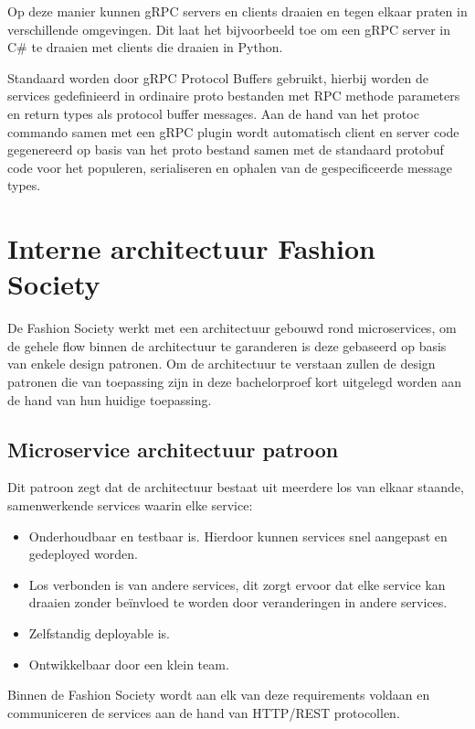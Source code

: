 Op deze manier kunnen gRPC servers en clients draaien en tegen elkaar praten in verschillende omgevingen. Dit laat het bijvoorbeeld toe om een gRPC server in C\# te draaien met clients die draaien in Python.

Standaard worden door gRPC Protocol Buffers gebruikt, hierbij worden de services gedefinieerd in ordinaire proto bestanden met RPC methode parameters en return types als protocol buffer messages. Aan de hand van het protoc commando samen met een gRPC plugin wordt automatisch client en server code gegenereerd op basis van het proto bestand samen met de standaard protobuf code voor het populeren, serialiseren en ophalen van de gespecificeerde message types.


\section{Interne architectuur Fashion Society}
\label{sec:Interne architectuur Fashion Society}

De Fashion Society werkt met een architectuur gebouwd rond microservices, om de gehele flow binnen de architectuur te garanderen is deze gebaseerd op basis van enkele design patronen. Om de architectuur te verstaan zullen de design patronen die van toepassing zijn in deze bachelorproef kort uitgelegd worden aan de hand van hun huidige toepassing.

\subsection{Microservice architectuur patroon}
\label{subsec:Microservice architectuur patroon}

Dit patroon zegt dat de architectuur bestaat uit meerdere los van elkaar staande, samenwerkende services waarin elke service:
 \begin{itemize}
     \item Onderhoudbaar en testbaar is. Hierdoor kunnen services snel aangepast en gedeployed worden.
     \item Los verbonden is van andere services, dit zorgt ervoor dat elke service kan draaien zonder beïnvloed te worden door veranderingen in andere services.
     \item Zelfstandig deployable is.
     \item Ontwikkelbaar door een klein team.
 \end{itemize}
\autocite{Richardsonc}

Binnen de Fashion Society wordt aan elk van deze requirements voldaan en communiceren de services aan de hand van HTTP/REST protocollen.

